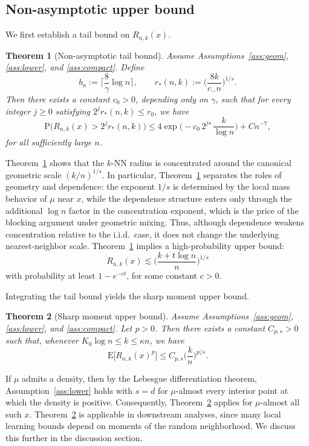 \documentclass[12pt]{article}
\def\P{{\mathrm P}}
\def\E{{\mathrm E}}
\newtheorem{theorem}{Theorem}
\theoremstyle{definition}
\begin{document}
\subsection{Non-asymptotic upper bound}

We first establish a tail bound on $R_{n,k}(x)$.
\begin{theorem}[Non-asymptotic tail bound]\label{thm:tail}
Assume Assumptions~\ref{ass:geom}, \ref{ass:lower}, and \ref{ass:compact}. Define
\[
  b_n := \Big\lceil \frac{8}{\gamma}\log n \Big\rceil,
  \qquad
  r_*(n,k) := \Big(\frac{8k}{c_- n}\Big)^{1/s}.
\]
Then there exists a constant $c_0>0$, depending only on $\gamma$, such that for every integer $j \ge 0$ satisfying $2^j r_*(n,k) \le r_0$, we have
\[
  \P\big(R_{n,k}(x) > 2^j r_*(n,k)\big)
  \le
  4\exp \Big(-c_0\,2^{js}\,\frac{k}{\log n}\Big)
  + C n^{-7},
\]
for all sufficiently large $n$.
\end{theorem}

Theorem~\ref{thm:tail} shows that the $k$-NN radius is concentrated around the canonical geometric scale $(k/n)^{1/s}$. In particular, Theorem~\ref{thm:tail} separates the roles of geometry and dependence: the exponent $1/s$ is determined by the local mass behavior of $\mu$ near $x$, while the dependence structure enters only through the additional $\log n$ factor in the concentration exponent, which is the price of the blocking argument under geometric mixing. Thus, although dependence weakens concentration relative to the i.i.d.\ case, it does not change the underlying nearest-neighbor scale. Theorem~\ref{thm:tail} implies a high-probability upper bound:
\[
  R_{n,k}(x)
  \lesssim
  \Big(\frac{k+t\log n}{n}\Big)^{1/s}
\]
with probability at least $1-e^{-ct}$, for some constant $c>0$.

Integrating the tail bound yields the sharp moment upper bound.


\begin{theorem}[Sharp moment upper bound]\label{thm:moment}
Assume Assumptions~\ref{ass:geom}, \ref{ass:lower}, and \ref{ass:compact}. Let $p>0$. Then there exists a constant $C_{p,s}>0$ such that, whenever $K_0\log n \le k \le \kappa n$, we have
\[
  \E\big[R_{n,k}(x)^p\big]
  \le
  C_{p,s}\Big(\frac{k}{n}\Big)^{p/s}.
\]
\end{theorem}

If $\mu$ admits a density, then by the Lebesgue differentiation theorem, Assumption~\ref{ass:lower} holds with $s=d$ for $\mu$-almost every interior point at which the density is positive. Consequently, Theorem~\ref{thm:moment} applies for $\mu$-almost all such $x$. Theorem~\ref{thm:moment} is applicable in downstream analyses, since many local learning bounds depend on moments of the random neighborhood. We discuss this further in the discussion section.
\end{document}
